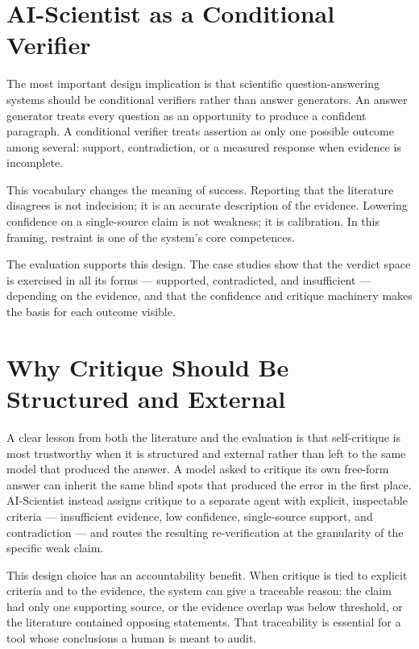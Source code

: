 \section{AI-Scientist as a Conditional Verifier }

The most important design implication is that scientific question-answering systems should be conditional verifiers
rather than answer generators. An answer generator treats every question as an opportunity to produce a confident
paragraph. A conditional verifier treats assertion as only one possible outcome among several: support,
contradiction, or a measured response when evidence is incomplete.

This vocabulary changes the meaning of success. Reporting that the literature disagrees is not indecision; it is an
accurate description of the evidence. Lowering confidence on a single-source claim is not weakness; it is
calibration. In this framing, restraint is one of the system's core competences.

The evaluation supports this design. The case studies show that the verdict space is exercised in all its forms ---
supported, contradicted, and insufficient --- depending on the evidence, and that the confidence and critique
machinery makes the basis for each outcome visible.

\section{Why Critique Should Be Structured and External }

A clear lesson from both the literature and the evaluation is that self-critique is most trustworthy when it is
structured and external rather than left to the same model that produced the answer. A model asked to critique its
own free-form answer can inherit the same blind spots that produced the error in the first place. AI-Scientist
instead assigns critique to a separate agent with explicit, inspectable criteria --- insufficient evidence, low
confidence, single-source support, and contradiction --- and routes the resulting re-verification at the
granularity of the specific weak claim.

This design choice has an accountability benefit. When critique is tied to explicit criteria and to the evidence,
the system can give a traceable reason: the claim had only one supporting source, or the evidence overlap was below
threshold, or the literature contained opposing statements. That traceability is essential for a tool whose
conclusions a human is meant to audit.

